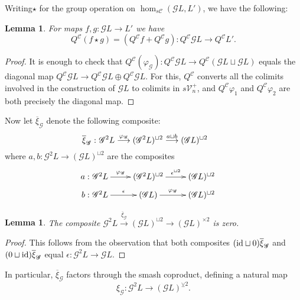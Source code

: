 \documentclass[11pt]{amsart}
\theoremstyle{plain}
\newtheorem{lem}[thm]{Lemma}
\theoremstyle{definition}
\let\phi\varphi
\renewcommand{\to}{\longrightarrow}
\newcommand{\scrG}{\mathscr{G}}
\newcommand{\calV}{\mathcal{V}}
\newcommand{\calc}{\mathcal{C}}
\theoremstyle{plain}
\newcommand{\vect}[2]{\calV^{#1}_{#2}}
\newcommand{\BSW}{{\scrG}}
\newcommand{\Id}{\textup{id}}
\newcommand{\smashcoprod}{\veebar}%
\begin{document}
\begin{Composite functor spectral sequences}
Writing$\star$ for the group operation on $\hom_{s\calc}(\BSW L,L')$, we have the following:
\begin{lem}
For maps $f,g:\BSW L\to L'$ we have 
\[Q^{\calc}(f\star g)=(Q^{\calc}f+Q^{\calc}g):Q^{\calc}\BSW L\to Q^{\calc}L'.\]
\end{lem}
\begin{proof}
It is enough to check that $Q^{\calc}(\phi_\BSW ):Q^{\calc}\BSW L\to Q^{\calc}(\BSW L\sqcup \BSW L)$ equals the diagonal map $Q^{\calc}\BSW L\to Q^{\calc}\BSW L\oplus Q^{\calc}\BSW L$. For this, $Q^{\calc}$ converts all the colimits involved in the construction of $\BSW L$ to colimits in $s\vect{+}{n}$, and $Q^{\calc}\phi_1$ and $Q^{\calc}\phi_2$ are both precisely the diagonal map.
\end{proof}

Now let $\overline{\xi}_{\BSW }$ denote the following composite:
\[\makebox[0mm][r]{$\overline{\xi}_{\BSW }:\ $}\BSW^2L\overset{\phi_{\BSW }}{\to}(\BSW^2L)^{\sqcup2}\overset{a\sqcup b}{\to}(\BSW L)^{\sqcup2}\]
where $a,b:\BSW^2L\to(\BSW L)^{\sqcup2}$ are the composites
\[\xymatrix@R=2mm{
\makebox[0mm][r]{$a:\ $}\BSW^2L\ar[r]^-{\phi_{\BSW }}
&%
(\BSW^2L)^{\sqcup2}\ar[r]^-{\epsilon^{\sqcup2}}
&%
(\BSW L)^{\sqcup2}\\
\makebox[0mm][r]{$b:\ $}\BSW^2L\ar[r]^-{\epsilon}
&%
(\BSW L)\ar[r]^-{\phi_{\BSW }}
&%
(\BSW L)^{\sqcup2}
}\]
\begin{lem}
The composite 
$\BSW^2L\overset{\overline{\xi}_{\BSW }}{\to}(\BSW L)^{\sqcup2}\to(\BSW L)^{\times2}$ is zero.
\end{lem}
\begin{proof}
This follows from the observation that both composites $(\Id\sqcup0)\overline{\xi}_{\BSW }$ and $(0\sqcup\Id)\overline{\xi}_{\BSW }$ equal $\epsilon:\BSW^2L\to \BSW L$.
\end{proof}
In particular, $\overline{\xi}_{\BSW }$ factors through the smash coproduct, defining a natural map
\[\xi_{\BSW }:\BSW^2L\to (\BSW L)^{\smashcoprod 2}.\]


\end{Composite functor spectral sequences}
\end{document}
